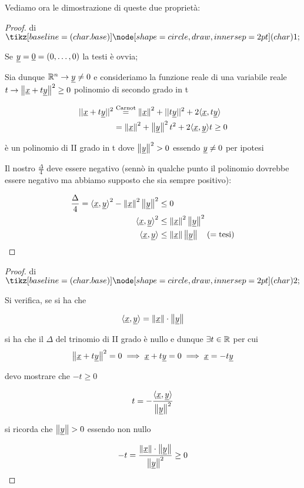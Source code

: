 Vediamo ora le dimostrazione di queste due proprietà:

\begin{proof} di \(\circled{1}\)

    Se \(\underline{y} = \underline{0} = (0, \ldots ,0)\) la testi è ovvia;

    Sia dunque \(\mathbb{R}^{n}  \rightarrow \underline{y} \neq 0\) e consideriamo la funzione reale di una variabile reale \(t \rightarrow \left\lVert\underline{x}+t\underline{y}\right\rVert^{2}\ge 0\) polinomio di secondo grado in t

    \begin{align*}
        ||\underline{x} + t\underline{y}|| ^{2} & \overset{\text{Carnot}}{=} \left\lVert\underline{x}\right\rVert^{2} + ||t\underline{y}||^{2} + 2\langle \underline{x},t\underline{y} \rangle \\
                            & = \left\lVert\underline{x}\right\rVert^{2} + \left\lVert\underline{y}\right\rVert^{2}t^{2} + 2 \langle\underline{x},\underline{y}\rangle t \ge 0
    \end{align*}

    è un polinomio di II grado in t dove \(\left\lVert\underline{y}\right\rVert^{2}> 0 \) essendo \(\underline{y} \neq 0\) per ipotesi

    Il nostro \(\frac{\Delta}{4}\) deve essere negativo (sennò in qualche punto il polinomio dovrebbe essere negativo ma abbiamo supposto che sia sempre positivo):

    \begin{align*}
        \frac{\Delta}{4} = {\langle\underline{x},\underline{y}\rangle}^{2} - \left\lVert\underline{x}\right\rVert^{2}\left\lVert\underline{y}\right\rVert^{2} & \le 0                                       \\
        {\langle\underline{x},\underline{y}\rangle}^{2}                                               & \le \left\lVert\underline{x}\right\rVert^{2}\left\lVert\underline{y}\right\rVert^{2}                \\
        \langle\underline{x},\underline{y}\rangle                                                     & \le \left\lVert\underline{x}\right\rVert \left\lVert\underline{y}\right\rVert \quad (= \text{tesi})
    \end{align*}

\end{proof}

\filbreak{}

\begin{proof} di \(\circled{2}\)

    Si verifica, se si ha che

    \[
        \langle\underline{x},\underline{y}\rangle = \left\lVert\underline{x}\right\rVert \cdot \left\lVert\underline{y}\right\rVert
    \]

    si ha che il \(\Delta \) del trinomio di II grado è nullo e dunque \(\exists t \in \mathbb{R} \) per cui
    \[\left\lVert\underline{x}+t\underline{y}\right\rVert^{2}=0 \implies \underline{x} +t\underline{y}=0 \implies \underline{x}=-t\underline{y} \]

    devo mostrare che \(-t \ge 0\)

    \[
        t = - \frac{\langle\underline{x},\underline{y}\rangle}{\left\lVert\underline{y}\right\rVert^{2}}
    \]

    si ricorda che \(\left\lVert\underline{y}\right\rVert>0\) essendo \uy{} non nullo

    \[
        -t = \frac{\left\lVert\underline{x}\right\rVert \cdot \left\lVert\underline{y}\right\rVert}{\left\lVert\underline{y}\right\rVert^{2}}\ge 0
    \]

\end{proof}

